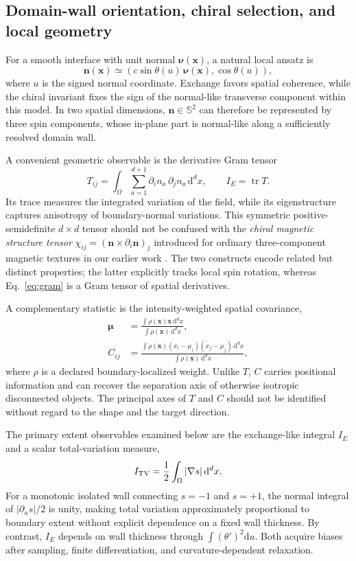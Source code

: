 \documentclass[11pt,a4paper]{article}
\newcommand{\nn}{\bm n}
\newcommand{\xx}{\bm x}
\newcommand{\dd}{\mathrm{d}}
\newcommand{\Sn}{\mathbb S}
\newcommand{\Tr}{\operatorname{tr}}
\newcommand{\diff}{\partial}
\begin{document}
\subsection{Domain-wall orientation, chiral selection, and local geometry}\label{subsec:theory:orient}
For a smooth interface with unit normal \(\bm\nu(\xx)\), a natural local ansatz is
\begin{equation}
 \nn(\xx)\simeq\left(c\sin\theta(u)\,\bm\nu(\xx),\cos\theta(u)\right),
 \label{eq:normalansatz}
\end{equation}
where \(u\) is the signed normal coordinate. Exchange favors spatial coherence, while the chiral invariant fixes the sign of the normal-like transverse component within this model. In two spatial dimensions, \(\nn\in\Sn^2\) can therefore be represented by three spin components, whose in-plane part is normal-like along a sufficiently resolved domain wall.

A convenient geometric observable is the derivative Gram tensor
\begin{equation}
 T_{ij}=\int_{\Omega}\sum_{a=1}^{d+1}\diff_i n_a\,\diff_j n_a\,\dd^dx,
 \qquad I_E=\Tr T.
 \label{eq:gram}
\end{equation}
Its trace measures the integrated variation of the field, while its eigenstructure captures anisotropy of boundary-normal variations. This symmetric positive-semidefinite \(d\times d\) tensor should not be confused with the \emph{chiral magnetic structure tensor} \(\chi_{ij}=(\nn\times\diff_i\nn)_j\) introduced for ordinary three-component magnetic textures in our earlier work \cite{Park2025iScience}. The two constructs encode related but distinct properties; the latter explicitly tracks local spin rotation, whereas Eq.~\eqref{eq:gram} is a Gram tensor of spatial derivatives.

A complementary statistic is the intensity-weighted spatial covariance,
\begin{align}
 \bm\mu&=\frac{\int\rho(\xx)\xx\,\dd^dx}{\int\rho(\xx)\,\dd^dx},\\
 C_{ij}&=\frac{\int\rho(\xx)(x_i-\mu_i)(x_j-\mu_j)\,\dd^dx}
 {\int\rho(\xx)\,\dd^dx},
 \label{eq:cov}
\end{align}
where \(\rho\) is a declared boundary-localized weight. Unlike \(T\), \(C\) carries positional information and can recover the separation axis of otherwise isotropic disconnected objects. The principal axes of \(T\) and \(C\) should not be identified without regard to the shape and the target direction.

The primary extent observables examined below are the exchange-like integral \(I_E\) and a scalar total-variation measure,
\begin{equation}
 I_{\rm TV}=\frac12\int_{\Omega}|\nabla s|\,\dd^dx.
 \label{eq:TV}
\end{equation}
For a monotonic isolated wall connecting \(s=-1\) and \(s=+1\), the normal integral of \(|\diff_u s|/2\) is unity, making total variation approximately proportional to boundary extent without explicit dependence on a fixed wall thickness. By contrast, \(I_E\) depends on wall thickness through \(\int(\theta')^2\dd u\). Both acquire biases after sampling, finite differentiation, and curvature-dependent relaxation.
\end{document}
